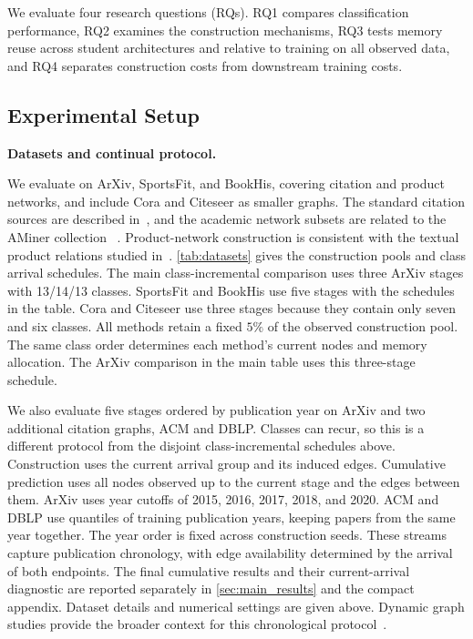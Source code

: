 We evaluate four research questions (RQs). RQ1 compares classification performance, RQ2 examines the construction mechanisms, RQ3 tests memory reuse across student architectures and relative to training on all observed data, and RQ4 separates construction costs from downstream training costs.

\subsection{Experimental Setup}

\noindent\textbf{Datasets and continual protocol.}

We evaluate \method{} on ArXiv, SportsFit, and BookHis, covering citation
and product networks, and include Cora and Citeseer as smaller graphs. The
standard citation sources are described in~\cite{tag_benchmark,cora,citeseer},
and the academic network subsets are related to the AMiner collection
~\cite{arnetminer}. Product-network construction is consistent with the
textual product relations studied in~\cite{amazon_graph,pin_sage}.
\autoref{tab:datasets} gives the construction pools and class arrival
schedules. The main class-incremental comparison uses three ArXiv stages with
13/14/13 classes. SportsFit and BookHis use five stages with the schedules in
the table. Cora and Citeseer use three stages because they contain only seven
and six classes. All methods retain a fixed \(5\%\) of the observed
construction pool. The same class order determines each method's current
nodes and memory allocation. The ArXiv comparison in the main table uses this
three-stage schedule.

We also evaluate five stages ordered by publication year on ArXiv and two
additional citation graphs, ACM and DBLP. Classes can recur, so this is a
different protocol from the disjoint class-incremental schedules above.
Construction uses the current arrival group and its induced edges. Cumulative
prediction uses all nodes observed up to the current stage and the edges
between them. ArXiv uses year cutoffs of 2015, 2016, 2017, 2018, and 2020.
ACM and DBLP use quantiles of training publication years, keeping papers from
the same year together. The year order is fixed across construction seeds.
These streams capture publication chronology, with edge availability
determined by the arrival of both endpoints. The final cumulative results
and their current-arrival diagnostic are reported separately in
\autoref{sec:main_results} and the compact appendix. Dataset details and
numerical settings are given above. Dynamic graph studies provide the broader
context for this chronological protocol~\cite{evolvegcn,tgn,dynamic_survey}.

